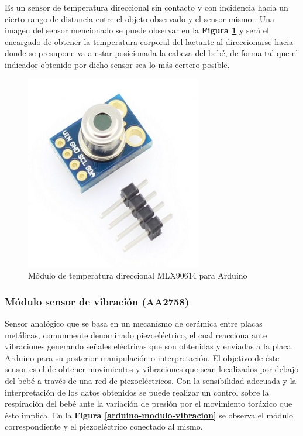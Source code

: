 \documentclass{IEEEtran}
\begin{document}
				Es un sensor de temperatura direccional sin contacto y con incidencia hacia un cierto rango de distancia entre el objeto observado y el sensor mismo \cite{temperaturatecnico}. Una imagen del sensor mencionado se puede observar en la \textbf{Figura \ref{arduino-modulo-temperatura}} y será el encargado de obtener la temperatura corporal del lactante al direccionarse hacia donde se presupone va a estar posicionada la cabeza del bebé, de forma tal que el indicador obtenido por dicho sensor sea lo más certero posible.

				\begin{figure}
					\centering
					\includegraphics[width=0.5\linewidth]{arduino-modulo-temperatura}
					\caption{Módulo de temperatura direccional MLX90614 para Arduino}
					\label{arduino-modulo-temperatura}
				\end{figure}

			\subsubsection{Módulo sensor de vibración (\textbf{AA2758})}
			
				Sensor analógico que se basa en un mecanísmo de cerámica entre placas metálicas, comunmente denominado piezoeléctrico, el cual reacciona ante vibraciones generando señales eléctricas que son obtenidas y enviadas a la placa Arduino para su posterior manipulación o interpretación. El objetivo de éste sensor es el de obtener movimientos y vibraciones que sean localizados por debajo del bebé a través de una red de piezoeléctricos. Con la sensibilidad adecuada y la interpretación de los datos obtenidos se puede realizar un control sobre la respiración del bebé ante la variación de presión por el movimiento toráxico que ésto implica. En la \textbf{Figura \ref{arduino-modulo-vibracion}} se observa el módulo correspondiente y el piezoeléctrico conectado al mismo.
\end{document}
